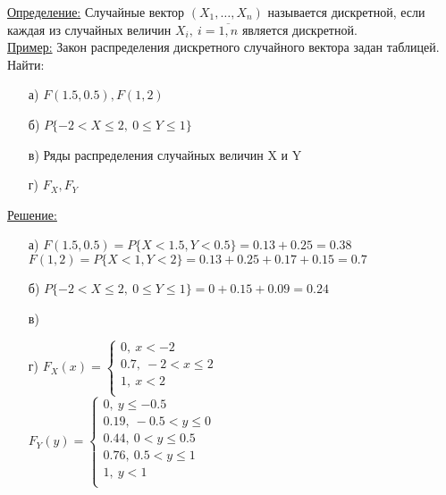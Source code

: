 
\underline{Определение:} Случайные вектор $(X_1, \ldots, X_n)$ называется дискретной, если каждая из случайных величин $X_i, \ i = \overline{1,n}$ является дискретной. \\

\underline{Пример:} Закон распределения дискретного случайного вектора задан таблицей. \\
Найти: \\
\begin{enumerate}
	\item[а)] $F(1.5, 0.5), F(1,2)$
	\item[б)] $P\{-2 < X \leqslant 2, \ 0 \leqslant Y \leqslant 1\}$ 
	\item[в)] Ряды распределения случайных величин X и Y
	\item[г)] $F_X, F_Y$
\end{enumerate}
\underline{Решение:} \\
\begin{enumerate}
	\item[а)] $F(1.5, 0.5) = P\{X < 1.5, Y < 0.5\} = 0.13 + 0.25 = 0.38$ \\
	$F(1,2) = P\{X < 1, Y < 2\} = 0.13 + 0.25 + 0.17 + 0.15 = 0.7$ 
	\item[б)] $P\{ -2 < X \leqslant 2, \ 0 \leqslant Y \leqslant 1\} = 0 + 0.15 + 0.09 = 0.24$ 
	\item[в)] 
	\item[г)] 
	$F_X(x) = 
	\begin{cases}
		0, \ x < -2 \\
		0.7, \ -2 < x \leqslant 2 \\
		1, \ x < 2 \\
	\end{cases}$ \\
	$F_Y(y) = 
	\begin{cases}
		0, \ y \leqslant - 0.5 \\
		0.19, \ -0.5 < y \leqslant 0 \\
		0.44, \ 0 < y \leqslant 0.5 \\
		0.76, \ 0.5 < y \leqslant 1 \\
		1, \ y < 1 \\
	\end{cases}$ \\
\end{enumerate}






















